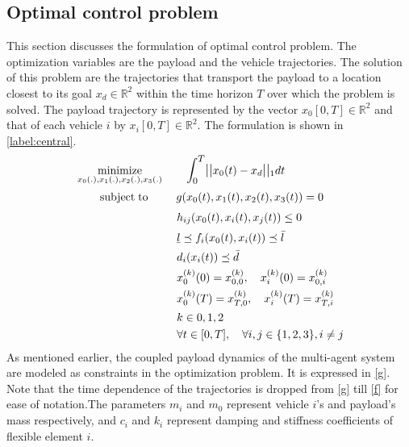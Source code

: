 \documentclass[letterpaper, 10 pt, conference]{ieeeconf}
\newcommand{\ubar}[1]{\text{\b{$#1$}}}
\DeclareMathOperator*{\minimize}{minimize}
\DeclareMathOperator*{\subj}{subject\;to}
\begin{document}
\subsection{Optimal control problem}
This section discusses the formulation of optimal control problem. The optimization variables are the payload and the vehicle trajectories. The solution of this problem are the trajectories that transport the payload to a location closest to its goal $x_d \in \mathbb{R}^2$ within the time horizon $T$ over which the problem is solved.
The payload trajectory is represented by the vector ${x_0[0,T] \in \mathbb{R}^2}$ and that of each vehicle $i$ by ${x_i[0,T] \in \mathbb{R}^2}$.
 The formulation is shown in \eqref{label:central}.
\begin{equation}
  \label{label:central}
  \begin{aligned}
    & \minimize_{x_0(.),x_1(.),x_2(.),x_3(.)} \qquad \mathlarger{\int_0^T} \mathlarger{||}x_0(t)-x_d\mathlarger{||}_1 dt \\
    & \qquad \subj
     \qquad \text{  } g(x_0(t),x_1(t),x_2(t),x_3(t)) = 0 \\
    &	\qquad  \qquad \qquad \quad \quad \quad h_{ij}(x_0(t),x_i(t),x_j(t)) \leq 0 \\
    &	\qquad  \qquad \qquad \quad \quad \quad \ubar{l} \preceq f_i(x_0(t),x_i(t)) \preceq \bar{l}\\   
    &	\qquad  \qquad \qquad \quad \quad \quad d_i(x_i(t)) \preceq \bar{d} \\
    &	\qquad  \qquad \qquad \quad \quad \quad x_0^{(k)}(0) = x_{0,0}^{(k)}, \quad x_i^{(k)}(0) = x_{0,i}^{(k)} \\
       &	 \qquad \qquad \qquad \quad \quad \quad x_0^{(k)}(T) = x_{T,0}^{(k)} , \quad x_i^{(k)}(T) = x_{T,i}^{(k)} \\
       &	 \qquad \qquad \qquad \quad \quad \quad k\in{0,1,2} \\
    &	 \qquad \qquad \qquad \quad \quad \quad \forall t \in [0,T], \quad \forall i,j \in \{1,2,3\}, i \neq j
  \end{aligned}
\end{equation}
As mentioned earlier, the coupled payload dynamics of the multi-agent system are modeled as constraints in the optimization problem. It is expressed in \eqref{g}. Note that the time dependence of the trajectories is dropped from \eqref{g} till \eqref{f} for ease of notation.The parameters $m_i$ and $m_0$ represent vehicle $i$'s and payload's mass respectively, and $c_i$ and $k_i$ represent damping and stiffness coefficients of flexible element $i$. 
\end{document}
